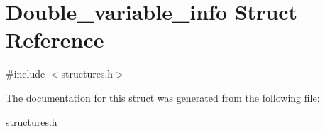 \hypertarget{structDouble__variable__info}{}\section{Double\+\_\+variable\+\_\+info Struct Reference}
\label{structDouble__variable__info}


{\ttfamily \#include $<$structures.\+h$>$}



The documentation for this struct was generated from the following file\+:\begin{DoxyCompactItemize}
\item 
\hyperlink{structures_8h}{structures.\+h}\end{DoxyCompactItemize}
